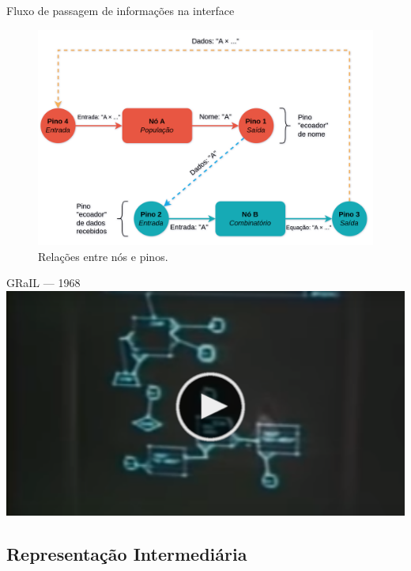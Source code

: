 \begin{frame}{Fluxo de passagem de informações na interface}
    \begin{figure}
        \centering
        \includegraphics[width=\textwidth, height=\textheight, keepaspectratio=true]{beamerthemesrc/images/fluxo-dados-gui.png}
        \caption{Relações entre nós e pinos.}
    \end{figure}
\end{frame}

\begin{frame}{GRaIL — 1968}
    \href{https://www.youtube.com/watch?v=QQhVQ1UG6aM}{
        \includegraphics[width=\textwidth, height=\textheight, keepaspectratio=true]{beamerthemesrc/images/video-thumb.png}
    }
\end{frame}

\subsection{Representação Intermediária}

